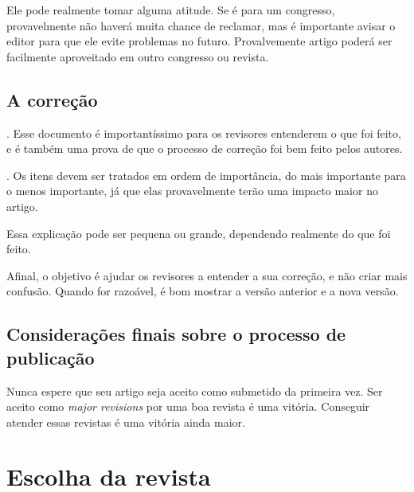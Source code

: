 \documentclass[openany]{book}
\begin{document}
 Ele pode realmente tomar alguma atitude. Se é para um congresso, provavelmente não haverá muita chance de reclamar, mas é importante avisar o editor para que ele evite problemas no futuro. Provalvemente artigo poderá ser facilmente aproveitado em outro congresso ou revista.

\section{A correção}

. Esse documento é importantíssimo para os revisores entenderem o que foi feito, e é também uma prova de que o processo de correção foi bem feito pelos autores.

. Os itens devem ser tratados em ordem de importância, do mais importante para o menos importante, já que elas provavelmente terão uma impacto maior no artigo.

 Essa explicação pode ser pequena ou grande, dependendo realmente do que foi feito.

 Afinal, o objetivo é ajudar os revisores a entender a sua correção, e não criar mais confusão.  Quando for razoável, é bom mostrar a versão anterior e a nova versão.



\section{Considerações finais sobre o processo de publicação}

Nunca espere que seu artigo seja aceito como submetido da primeira vez. Ser aceito como \textit{major revisions} por uma boa revista é uma vitória. Conseguir atender essas revistas é uma vitória ainda maior.



\chapter{Escolha da revista}

\end{document}
